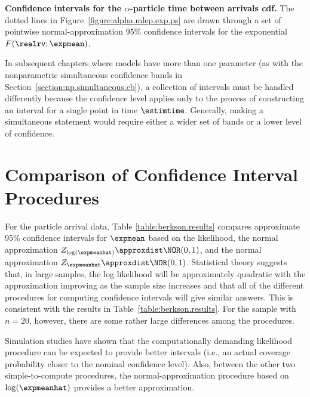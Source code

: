 \begin{example}
{\bf Confidence intervals for the $\alpha$-particle time between
arrivals cdf.}
The dotted lines in Figure~\ref{figure:alpha.mlep.exp.ps} are drawn
through a set of pointwise normal-approximation  95\%
confidence intervals for the exponential $F(\realrv;\expmean)$.
\end{example}

In subsequent chapters  where
models have more than one parameter (as with the nonparametric simultaneous
confidence bands in Section~\ref{section:np.simultaneous.cb}),
a collection of intervals must be
handled differently because the confidence level applies only to the
process of constructing an interval for a single point in time
$\estimtime$.  Generally, making a simultaneous statement would
require either a wider set of bands or a lower level of confidence.


\section{Comparison of Confidence Interval Procedures}
\label{section:exponential.ci.comparison}
For the particle arrival data, Table \ref{table:berkson.results}
compares approximate 95\% confidence intervals for $\expmean$
based on the likelihood, the normal approximation
$Z_{\log(\expmeanhat)} \approxdist
\NOR(0,1)$, and the normal approximation
$Z_{\expmeanhat} \approxdist \NOR(0,1)$.  Statistical theory suggests
that, in large samples, the log likelihood will be approximately
quadratic with the approximation improving as the sample size
increases and that all of the different procedures for computing
confidence intervals will give similar answers.  This is consistent
with the results in Table~\ref{table:berkson.results}.  For the sample
with $n=20$, however, there are some rather large differences among
the procedures.

Simulation studies have shown that the computationally demanding
likelihood procedure can be expected to provide better intervals (i.e.,
an actual coverage probability closer to the nominal confidence
level).  Also, between the other two simple-to-compute procedures, the
normal-approximation procedure based on $\log(\expmeanhat)$ provides a
better approximation. 

